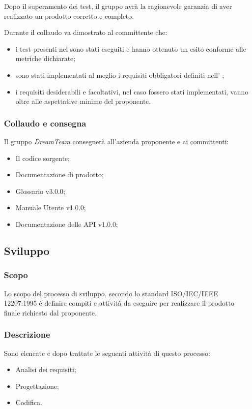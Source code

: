 Dopo il superamento  dei test, il gruppo avrà la ragionevole garanzia di aver realizzato un prodotto corretto e completo.

Durante il collaudo va dimostrato al committente che:
\begin{itemize}
\item i test presenti nel \PdQ sono stati eseguiti e hanno ottenuto un esito conforme alle metriche dichiarate;
\item sono stati implementati al meglio i requisiti obbligatori definiti nell' \AdR ;
\item i requisiti desiderabili e facoltativi, nel caso fossero stati implementati, vanno oltre
alle aspettative minime del proponente.
\end{itemize}

\subsubsection{Collaudo e consegna}

Il gruppo \textit{DreamTeam} consegnerà all’azienda proponente e ai committenti:
\begin{itemize}
\item Il codice sorgente;
\item Documentazione di prodotto;
\item Glossario v3.0.0;
\item Manuale Utente v1.0.0;
\item Documentazione delle API v1.0.0;
\end{itemize}
\subsection{Sviluppo}

\subsubsection{Scopo}
Lo scopo del processo di sviluppo, secondo lo standard  ISO/IEC/IEEE 12207:1995 è definire compiti e attività da eseguire per realizzare il prodotto finale richiesto dal proponente.

\subsubsection{Descrizione}
Sono elencate e dopo trattate le seguenti attività di questo processo:
\begin{itemize}
  \item Analisi dei requisiti;
  \item Progettazione;
  \item Codifica.
\end{itemize}
